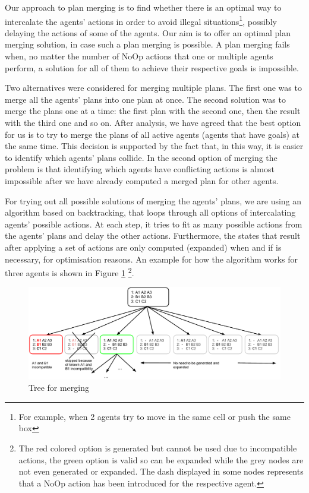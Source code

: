 Our approach to plan merging is to find whether there is an optimal way to intercalate the agents’ actions in
order to avoid illegal situations\footnote{For example, when 2 agents try to move in the same cell or push the
same box}, possibly delaying the actions of some of the agents. Our aim is to offer an optimal plan merging
solution, in case such a plan merging is possible. A plan merging fails when, no matter the number of NoOp
actions that one or multiple agents perform, a solution for all of them to achieve their respective goals is
impossible.

Two alternatives were considered for merging multiple plans. The first one was to merge all the agents' plans
into one plan at once. The second solution was to merge the plans one at a time: the first plan with the
second one, then the result with the third one and so on. After analysis, we have agreed that the best option
for us is to try to merge the plans of all active agents (agents that have goals) at the same time. This
decision is supported by the fact that, in this way, it is easier to identify which agents’ plans collide. In
the second option of merging the problem is that identifying which agents have conflicting actions is almost
impossible after we have already computed a merged plan for other agents.

For trying out all possible solutions of merging the agents’ plans, we are using an algorithm based on
backtracking, that loops through all options of intercalating agents’ possible actions. At each step, it tries
to fit as many possible actions from the agents’ plans and delay the other actions. Furthermore, the states
that result after applying a set of actions are only computed (expanded) when and if is necessary, for
optimisation reasons.  An example for how the algorithm works for three agents is shown in Figure
\ref{fig:plan_merging} \footnote{The red colored option is generated but cannot be used due to incompatible
actions, the green option is valid so can be expanded while the grey nodes are not even generated or expanded.
The dash displayed in some nodes represents that a NoOp action has been introduced for the respective agent.}.

\begin{figure}[htb]
\begin{center}
 \includegraphics[width=\textwidth]{figures/plan_merging.pdf}
 \caption{Tree for merging}
 \label{fig:plan_merging}
\end{center}
\end{figure}

